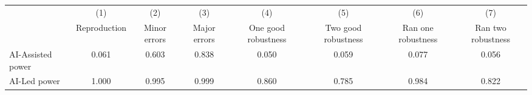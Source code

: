 \begin{tabular}{l*{7}{c}}
\hline\hline
& (1) & (2) & (3) & (4) & (5) & (6) & (7)\\
                    & Reproduction   &Minor errors   &Major errors   &One good robustness   &Two good robustness   &Ran one robustness   &Ran two robustness    \\
\hline
AI-Assisted power    & 0.061 & 0.603 & 0.838 & 0.050 & 0.059 & 0.077 & 0.056  \\
AI-Led power         & 1.000 & 0.995 & 0.999 & 0.860 & 0.785 & 0.984 & 0.822  \\
\hline
\hline
\end{tabular}
